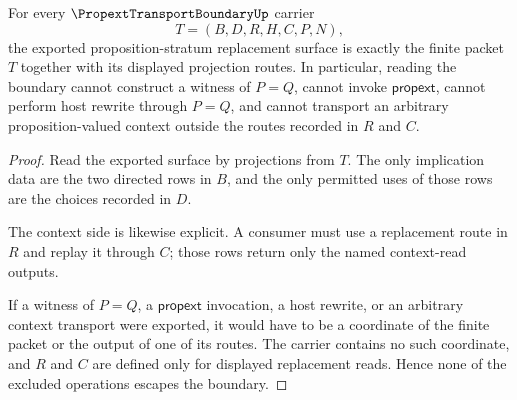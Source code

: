 \begin{theorem}
\label{thm:propext-transport-boundary-non-escape}
For every $\PropextTransportBoundaryUp$ carrier
$$
T=(B,D,R,H,C,P,N),
$$
the exported proposition-stratum replacement surface is exactly the finite packet $T$ together with its displayed projection routes. In particular, reading the boundary cannot construct a witness of $P=Q$, cannot invoke $\mathsf{propext}$, cannot perform host rewrite through $P=Q$, and cannot transport an arbitrary proposition-valued context outside the routes recorded in $R$ and $C$.
\end{theorem}
\begin{proof}
Read the exported surface by projections from $T$. The only implication data are the two directed rows in $B$, and the only permitted uses of those rows are the choices recorded in $D$.

The context side is likewise explicit. A consumer must use a replacement route in $R$ and replay it through $C$; those rows return only the named context-read outputs.

If a witness of $P=Q$, a $\mathsf{propext}$ invocation, a host rewrite, or an arbitrary context transport were exported, it would have to be a coordinate of the finite packet or the output of one of its routes. The carrier contains no such coordinate, and $R$ and $C$ are defined only for displayed replacement reads. Hence none of the excluded operations escapes the boundary.
\end{proof}

